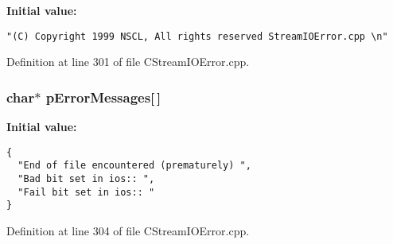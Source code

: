{\bf Initial value:}

\footnotesize\begin{verbatim} 
"(C) Copyright 1999 NSCL, All rights reserved StreamIOError.cpp \n"\end{verbatim}\normalsize 


Definition at line 301 of file CStream\-IOError.cpp.
\subsubsection{\setlength{\rightskip}{0pt plus 5cm}char$\ast$ p\-Error\-Messages[$\,$]\hspace{0.3cm}{\tt  [static]}}\label{CStreamIOError_8cpp_a2}


{\bf Initial value:}

\footnotesize\begin{verbatim}
{
  "End of file encountered (prematurely) ",
  "Bad bit set in ios:: ",
  "Fail bit set in ios:: "
}\end{verbatim}\normalsize 


Definition at line 304 of file CStream\-IOError.cpp.